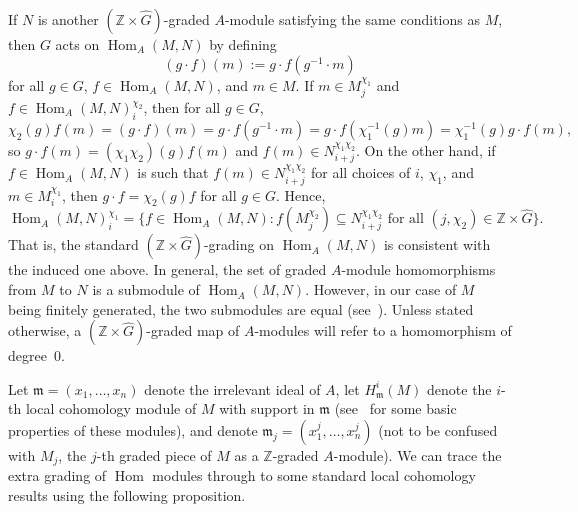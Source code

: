 \documentclass[ALCO,ThmDefs,Unicode]{cedram}
\DeclareMathOperator{\Hom}{Hom}
\newcommand{\ZZ}{{\mathbb Z}}
\newcommand{\mideal}{\ensuremath{\mathfrak{m}}}
\begin{document}
If $N$ is another $(\ZZ\times \hat{G})$-graded $A$-module satisfying the same conditions as $M$, then $G$ acts on $\Hom_A(M, N)$ by defining
\[
(g\cdot f)(m):=g\cdot f(g^{-1}\cdot m)
\]
for all $g\in G$, $f\in \Hom_A(M, N)$, and $m\in M$. If $m\in M_j^{\chi_1}$ and $f\in \Hom_A(M, N)_i^{\chi_2}$, then for all $g\in G$,
\[
\chi_2(g) f(m)=(g\cdot f)(m)=g\cdot f(g^{-1}\cdot m)=g\cdot f(\chi_1^{-1}(g)m)=\chi_1^{-1}(g)g\cdot f(m),
\]
so $g\cdot f(m)=(\chi_1\chi_2)(g)f(m)$ and $f(m)\in N_{i+j}^{\chi_1\chi_2}$. On the other hand, if $f\in \Hom_A(M, N)$ is such that $f(m)\in N_{i+j}^{\chi_1\chi_2}$ for all choices of $i$, $\chi_1$, and $m\in M_i^{\chi_1}$, then $g\cdot f=\chi_2(g) f$ for all $g\in G$. Hence,
\[
\Hom_A(M, N)_i^{\chi_1}=\{f\in\Hom_A(M, N): f(M_j^{\chi_2})\subseteq N_{i+j}^{\chi_1\chi_2}\text{ for all }(j,\chi_2)\in\ZZ\times \hat{G}\}.
\]
That is, the standard $(\ZZ\times \hat{G})$-grading on $\Hom_A(M, N)$ is consistent with the induced one above. In general, the set of graded $A$-module homomorphisms from $M$ to $N$ is a submodule of $\Hom_A(M, N)$. However, in our case of $M$ being finitely generated, the two submodules are equal (see~\cite[Section~II.11.6]{Bourbaki}). Unless stated otherwise, a $(\ZZ\times\hat{G})$-graded map of $A$-modules will refer to a homomorphism of degree~$0$.

Let $\mideal=(x_1, \ldots, x_n)$ denote the irrelevant ideal of $A$, let $H_\mideal^i(M)$ denote the $i$-th local cohomology module of $M$ with support in $\mideal$ (see~\cite{24Hours} for some basic properties of these modules), and denote $\mideal_j=(x_1^j, \ldots, x_n^j)$ (not to be confused with $M_j$, the $j$-th graded piece of $M$ as a $\ZZ$-graded $A$-module). We can trace the extra grading of $\Hom$ modules through to some standard local cohomology results using the following proposition.
\end{document}
